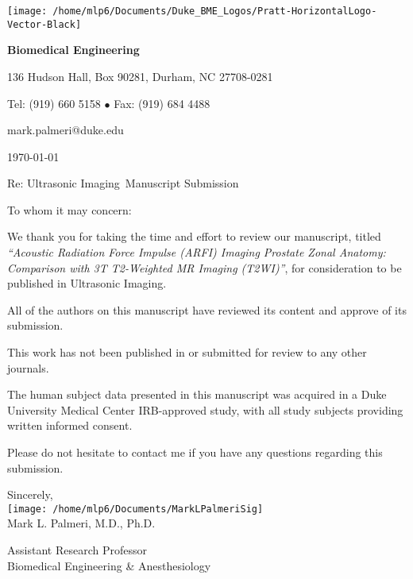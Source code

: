 \documentclass[10pt]{article}
\newcommand{\journal}{Ultrasonic Imaging}
\begin{document}
\begin{minipage}[t]{0.5\linewidth}
\vspace{0pt}
\texttt{[image: /home/mlp6/Documents/Duke\_BME\_Logos/Pratt-HorizontalLogo-Vector-Black]}
\end{minipage}\hfill
\begin{minipage}[t]{0.5\linewidth}
\vspace{0pt}
\hfill{\bf Biomedical Engineering}\\

\begin{small}
\hfill 136 Hudson Hall, Box 90281, Durham, NC 27708-0281

\hfill Tel: (919) 660 5158 $\bullet$ Fax: (919) 684 4488

\hfill mark.palmeri@duke.edu\\
\end{small}
\end{minipage}
\begin{Large}

\vspace{0.25in}
\today
\vspace{0.25in}

Re: \journal~Manuscript Submission
\vspace{0.25in}

To whom it may concern:
\vspace{0.1in}

We thank you for taking the time and effort to review our manuscript, titled
{\it ``Acoustic Radiation Force Impulse (ARFI) Imaging Prostate Zonal Anatomy:
    Comparison with 3T T2-Weighted MR Imaging (T2WI)''}, for consideration to
be published in \journal.  

All of the authors on this manuscript have reviewed its content and approve of
its submission.  

This work has not been published in or submitted for review to any other
journals.  

The human subject data presented in this manuscript was acquired in a Duke
University Medical Center IRB-approved study, with all study subjects providing
written informed consent.

Please do not hesitate to contact me if you have any questions regarding this
submission.

\vspace{0.25in}

Sincerely,\\
\texttt{[image: /home/mlp6/Documents/MarkLPalmeriSig]}\\
Mark L. Palmeri, M.D., Ph.D.\\
\end{Large}
Assistant Research Professor\\
Biomedical Engineering \& Anesthesiology
\end{document}
